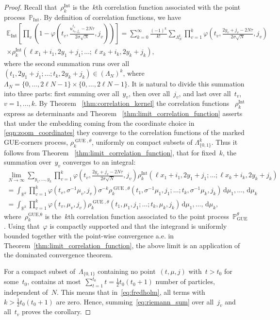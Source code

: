 \documentclass[11pt]{article}
\theoremstyle{plain}
\theoremstyle{definition}
\numberwithin{equation}{section}
\newcommand{\RR}{\mathbb{R}}
\newcommand{\EE}{\mathbb{E}}
\newcommand{\PP}{\mathbb{P}}
\renewcommand{\d}{\,\mathrm{d}}
\begin{document}
\begin{proof} 
%
Recall that~$\rho_k^{\operatorname{Int}}$ is the~$k$th correlation function associated with the point process~$\PP_{\operatorname{Int}}$. By definition of correlation functions, we have
\begin{multline}\label{eq:fredholm}
\EE_{\operatorname{Int}}\left[\prod_v \left(1-\varphi\left(t_v,\frac{u_{s_v,j_v}^{t_v}-2 N\tau }{2\sigma\sqrt{N}},j_v\right)\right)\right]
=
\sum_{k=0}^\infty\frac{(-1)^k}{k!}\sum_{\Lambda_N^k}\prod_{v=1}^k \varphi\left(t_v,\frac{2y_v+j_v-2 N\tau }{2\sigma\sqrt{N}},j_v\right) \\
\times \rho_k^{\operatorname{Int}}(\ell x_1+i_1,2y_1+j_1;\dots;\ell x_k+i_k,2y_k+j_k),
\end{multline}
where the second summation runs over all~$(t_1,2y_1+j_1;\dots;t_k,2y_k+j_k)\in (\Lambda_N)^k$, where $\Lambda_N=\{0,\dots,2\ell N-1\}\times \{0,\dots,2\ell N-1\}$. It is natural to divide this summation into three parts: first summing over all~$y_v$, then over all~$j_v$, and last over all~$t_v$,~$v=1,\dots,k$.
By Theorem ~\ref{thm:correlation_kernel} the correlation functions ~$\rho_k^{\operatorname{Int}}$ express as determinants and Theorem  ~\ref{thm:limit_correlation_function} asserts that under the embedding coming from the coordinate choice in \eqref{eqn:zoom_coordinates} they converge to the correlation functions of the marked GUE-corners process, $\rho_k^{\operatorname{GUE},\theta}$, uniformly on compact subsets of $\Lambda_{\{0,1\}}^k$.
Thus it follows from Theorem ~\ref{thm:limit_correlation_function}, that for fixed~$k$, the summation over~$y_v$ converges to an integral:
%
\begin{multline}\label{eq:riemann_sum}
\lim_{N\to\infty}\sum_{y_1,\dots,y_k}\prod_{v=1}^k \varphi\left(t_v,\frac{2y_v+j_v-2 N\tau }{2\sigma \sqrt{N}},j_v\right)
\rho_k^{\operatorname{Int}}(\ell x_1+i_1,2y_1+j_1;\dots;\ell x_k+i_k,2y_k+j_k) \\
=
\int_{\RR^k}\prod_{v=1}^k \varphi\left(t_v,\sigma^{-1}\mu_v,j_v\right)
\sigma^{-k}\rho_k^{\operatorname{GUE},\theta}(t_1,\sigma^{-1}\mu_1,j_1;\dots;t_k,\sigma^{-1}\mu_k,j_k)\d \mu_1,\dots,\d \mu_k \\
=
\int_{\RR^k}\prod_{v=1}^k \varphi\left(t_v,\mu_v,j_v\right)
\rho_k^{\operatorname{GUE},\theta}(t_1,\mu_1,j_1;\dots;t_k,\mu_k,j_k)\d \mu_1,\dots,\d \mu_k,
\end{multline}
where~$\rho_k^{\operatorname{GUE,\theta}}$ is the~$k$th correlation function associated to the point process~$\PP_{\operatorname{GUE}}^\theta$. Using that~$\varphi$ is compactly supported and that the integrand is uniformly bounded together with the point-wise convergence a.e. in Theorem~\ref{thm:limit_correlation_function}, the above limit is an application of the dominated convergence theorem.

For a compact subset of~$\Lambda_{\{0,1\}}$ containing no point~$(t,\mu,j)$ with~$t>t_0$ for some~$t_0$, contains at most~$\sum_{t=1}^{t_0} t=\frac{1}{2}t_0(t_0+1)$ number of particles, independent of~$N$. This means that in~\eqref{eq:fredholm}, all terms with~$k>\frac{1}{2}t_0(t_0+1)$ are zero. Hence, summing~\eqref{eq:riemann_sum} over all~$j_v$ and all~$t_v$ proves the corollary.
\end{proof}
\end{document}
